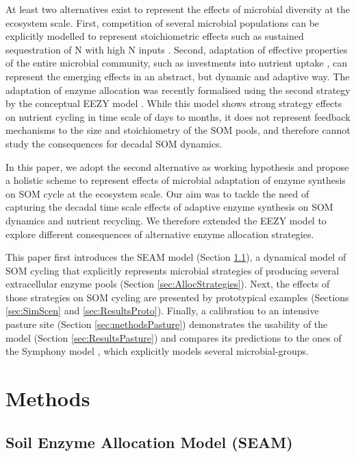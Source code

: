 At least two alternatives exist to represent the effects of microbial diversity
at the ecosystem scale. First, competition of several microbial populations can
be explicitly modelled to represent stoichiometric effects such as sustained
sequestration of N with high N inputs \citep{Perveen14}. Second, adaptation of
effective properties of the entire microbial community, such as investments into
nutrient uptake \citep{Rastetter97, Rastetter11}, can represent the emerging
effects in an abstract, but dynamic and adaptive way. The adaptation of enzyme
allocation was recently formalised using the second strategy by the conceptual
EEZY model \citep{Moorhead12}.
While this model shows strong strategy effects on nutrient cycling in time scale
of days to months, it does not represent feedback mechanisms to the size and
stoichiometry of the SOM pools, and therefore cannot study the consequences for
decadal SOM dynamics.

In this paper, we adopt the second alternative as working hypothesis and propose
a holistic scheme to represent effects of microbial adaptation of enzyme
synthesis on SOM cycle at the ecosystem scale. Our aim was to tackle the need
of capturing the decadal time scale effects of adaptive enzyme synthesis on 
SOM dynamics and nutrient recycling. We therefore extended the EEZY model to
explore different consequences of alternative enzyme allocation strategies.

This paper first introduces the SEAM model (Section \ref{sec:SEAM}), a dynamical
model of SOM cycling that explicitly represents microbial strategies of
producing several extracellular enzyme pools (Section
\ref{sec:AllocStrategies}). Next, the effects of those strategies on SOM cycling
are presented by prototypical examples (Sections \ref{sec:SimScen} and
\ref{sec:ResultsProto}).
Finally, a calibration to an intensive pasture site (Section
\ref{sec:methodsPasture}) demonstrates the usability of the model (Section
\ref{sec:ResultsPasture}) and compares its predictions to the ones of the
Symphony model \citep{Perveen14}, which explicitly models several
microbial-groups. 

\section{Methods}
\subsection{Soil Enzyme Allocation Model (SEAM)}
\label{sec:SEAM}

